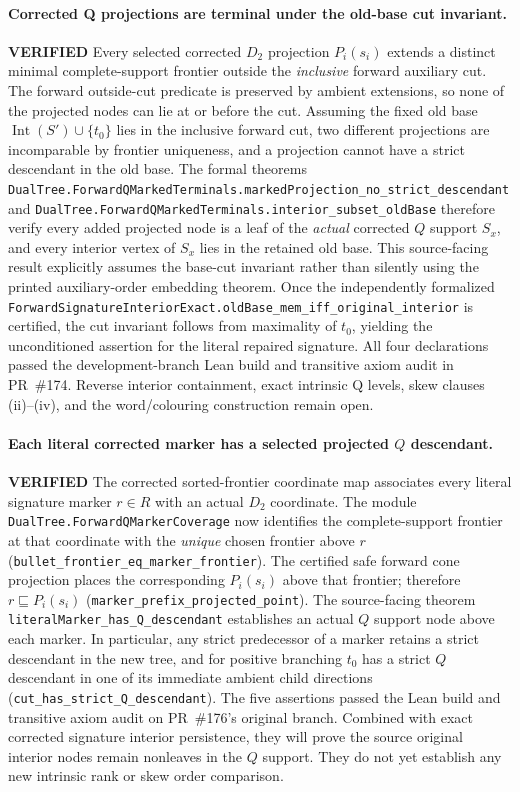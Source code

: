 \documentclass[11pt]{article}
\newcommand{\ok}{\textcolor{green!40!black}{\textbf{VERIFIED}}}
\newcommand{\lean}[1]{\texttt{#1}}
\begin{document}
\paragraph{Corrected Q projections are terminal under the old-base cut invariant.} \ok
Every selected corrected $D_2$ projection
$P_i(s_i)$ extends a distinct minimal
complete-support frontier outside the
\emph{inclusive} forward auxiliary cut.
The forward outside-cut predicate is
preserved by ambient extensions, so
none of the projected nodes can lie at
or before the cut.
Assuming the fixed old base
$\operatorname{Int}(S')\cup\{t_0\}$
lies in the inclusive forward cut,
two different projections are
incomparable by frontier uniqueness,
and a projection cannot have a
strict descendant in the old base.
The formal theorems
\lean{DualTree.ForwardQMarkedTerminals.markedProjection_no_strict_descendant}
and \lean{DualTree.ForwardQMarkedTerminals.interior_subset_oldBase}
therefore verify every added projected
node is a leaf of the \emph{actual}
corrected $Q$ support $S_x$, and
every interior vertex of $S_x$
lies in the retained old base.
This source-facing result explicitly
assumes the base-cut invariant rather
than silently using the printed
auxiliary-order embedding theorem.
Once the independently formalized
\lean{ForwardSignatureInteriorExact.oldBase_mem_iff_original_interior}
is certified, the cut invariant
follows from maximality of $t_0$,
yielding the unconditioned assertion
for the literal repaired signature.
All four declarations passed the development-branch Lean build
and transitive axiom audit in PR~\#174.
Reverse interior containment, exact
intrinsic Q levels, skew clauses
(ii)--(iv), and the word/colouring
construction remain open.

\paragraph{Each literal corrected marker has a selected projected $Q$ descendant.} \ok
The corrected sorted-frontier coordinate
map associates every literal signature marker
$r\in R$ with an actual $D_2$ coordinate.
The module
\lean{DualTree.ForwardQMarkerCoverage}
now identifies the complete-support frontier
at that coordinate with the
\emph{unique} chosen frontier above $r$
(\lean{bullet_frontier_eq_marker_frontier}).
The certified safe forward cone projection
places the corresponding $P_i(s_i)$
above that frontier; therefore
$r\sqsubseteq P_i(s_i)$
(\lean{marker_prefix_projected_point}).
The source-facing theorem
\lean{literalMarker_has_Q_descendant}
establishes an actual $Q$ support node
above each marker. In particular, any
strict predecessor of a marker retains a
strict descendant in the new tree, and
for positive branching $t_0$ has a
strict $Q$ descendant in one of its
immediate ambient child directions
(\lean{cut_has_strict_Q_descendant}).
The five assertions passed the Lean build and transitive
axiom audit on PR~\#176's original branch.
Combined with exact corrected signature
interior persistence, they will prove
the source original interior nodes
remain nonleaves in the $Q$ support.
They do not yet establish any new
intrinsic rank or skew order comparison.
\end{document}
